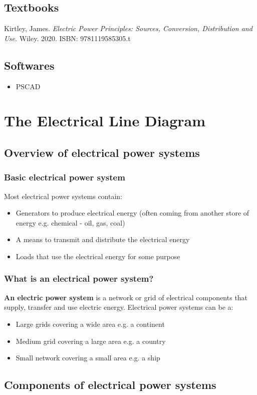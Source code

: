 \documentclass[class=report, crop=false, 12pt,a4paper]{standalone}
\begin{document}
\section{Textbooks}
Kirtley, James. \textit{Electric Power Principles: Sources, Conversion, Distribution and Use.} Wiley. 2020. ISBN: 9781119585305.t
\section{Softwares}
\begin{itemize}
	\item PSCAD
\end{itemize}
\chapter{The Electrical Line Diagram}
\section{Overview of electrical power systems}
\subsection{Basic electrical power system}
Most electrical power systems contain:
\begin{itemize}
	\item Generators to produce electrical energy (often coming from another store of energy e.g. chemical - oil, gas, coal)
	\item A means to transmit and distribute the electrical energy
	\item Loads that use the electrical energy for some purpose
\end{itemize}
\subsection{What is an electrical power system?}
\textbf{An electric power system} is a network or grid of electrical components that supply, transfer and use electric energy. Electrical power systems can be a:
\begin{itemize}
	\item Large grids covering a wide area e.g. a continent
	\item Medium grid covering a large area e.g. a country
	\item Small network covering a small area e.g. a ship
\end{itemize}
\section{Components of electrical power systems}
\end{document}
